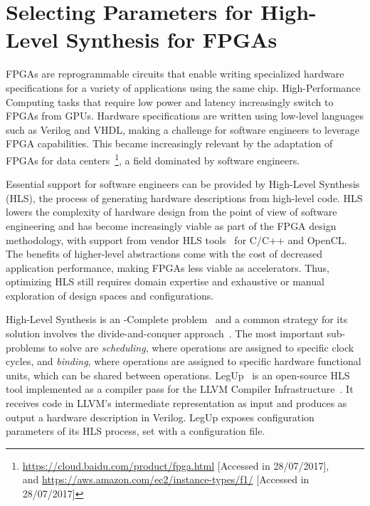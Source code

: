 \section{Selecting Parameters for High-Level Synthesis for FPGAs}
\label{sec:FPGA}

FPGAs are reprogrammable circuits that enable writing specialized hardware
specifications for a variety of applications using the same chip.
High-Performance Computing tasks that require low power and latency
increasingly switch to FPGAs from GPUs. Hardware specifications are written
using low-level languages such as Verilog and VHDL, making a challenge for
software engineers to leverage FPGA capabilities.  This became increasingly
relevant by the adaptation of FPGAs for data
centers~\cite{caulfield2016cloud}\footnote{\url{https://cloud.baidu.com/product/fpga.html}
[Accessed in 28/07/2017], \\ and
\url{https://aws.amazon.com/ec2/instance-types/f1/} [Accessed in 28/07/2017]},
a field dominated by software engineers.

Essential support for software engineers can be provided by High-Level
Synthesis (HLS), the process of generating hardware descriptions from
high-level code.  HLS lowers the complexity of hardware design from the point
of view of software engineering and has become increasingly viable as part of
the FPGA design methodology, with support from vendor HLS
tools~\cite{singh2011implementing, feist2012vivado} for C/C++ and OpenCL. The
benefits of higher-level abstractions come with the cost of decreased
application performance, making FPGAs less viable as accelerators.  Thus,
optimizing HLS still requires domain expertise and exhaustive or manual
exploration of design spaces and configurations.

High-Level Synthesis is an \NP{}-Complete problem~\cite{canis2015legup} and a
common strategy for its solution involves the divide-and-conquer
approach~\cite{coussy2009introduction}.  The most important sub-problems to
solve are \textit{scheduling}, where operations are assigned to specific clock
cycles, and \textit{binding}, where operations are assigned to specific
hardware functional units, which can be shared between operations.
LegUp~\cite{canis2013legup} is an open-source HLS tool implemented as a
compiler pass for the LLVM Compiler Infrastructure~\cite{chris2004llvm}.  It
receives code in LLVM's intermediate representation as input and produces as
output a hardware description in Verilog.  LegUp exposes configuration
parameters of its HLS process, set with a configuration file.

